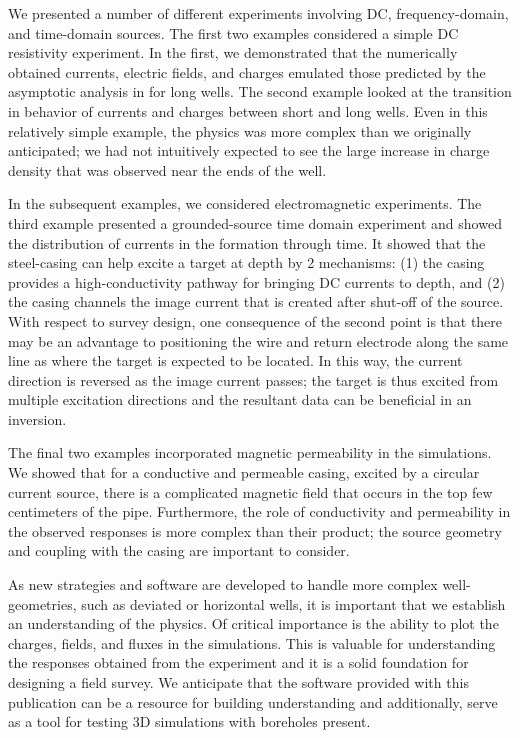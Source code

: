 We presented a number of different experiments involving DC, frequency-domain, and time-domain sources. The first two examples considered a simple DC resistivity experiment. In the first, we demonstrated that the numerically obtained currents, electric fields, and charges emulated those predicted by the asymptotic analysis in \cite{Kaufman1990} for long wells. The second example looked at the transition in behavior of currents and charges between short and long wells. Even in this relatively simple example, the physics was more complex than we originally anticipated; we had not intuitively expected to see the large increase in charge density that was observed near the ends of the well.

In the subsequent examples, we considered electromagnetic experiments. The third example presented a grounded-source time domain experiment and showed the distribution of currents in the formation through time. It showed that the steel-casing can help excite a target at depth by 2 mechanisms: (1) the casing provides a high-conductivity pathway for bringing DC currents to depth, and (2) the casing channels the image current that is created after shut-off of the source. With respect to survey design, one consequence of the second point is that there may be an advantage to positioning the wire and return electrode along the same line as where the target is expected to be located. In this way, the current direction is reversed as the image current passes; the target is thus excited from  multiple excitation directions and the resultant data can be beneficial in an inversion.

The final two examples incorporated magnetic permeability in the simulations. We showed that for a conductive and permeable casing, excited by a circular current source, there is a complicated magnetic field that occurs in the top few centimeters of the pipe. Furthermore, the role of conductivity and permeability in the observed responses is more complex than their product; the source geometry and coupling with the casing are important to consider.

As new strategies and software are developed to handle more complex well-geometries, such as deviated or horizontal wells, it is important that we establish an understanding of the physics. Of critical importance is the ability to plot the charges, fields, and fluxes in the simulations. This is valuable for understanding the responses obtained from the experiment and it is a solid foundation for designing a field survey. We anticipate that the software provided with this publication can be a resource for building understanding and additionally, serve as a tool for testing 3D simulations with boreholes present.


